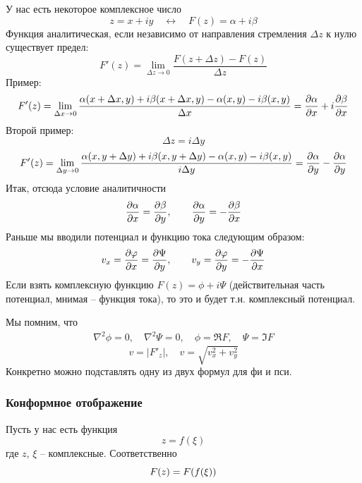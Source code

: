 У нас есть некоторое комплексное число
\begin{equation}
	z=x+iy 
	\quad \leftrightarrow \quad
	F(z)=\alpha+i \beta
\end{equation}
Функция аналитическая, если независимо от направления стремления $\Delta z$ к нулю существует предел:
\begin{equation}
	F'(z)=\lim\limits_{\Delta z\to0}\frac{F(z+\Delta z)-F(z)}{\Delta z}
\end{equation}
Пример:
\begin{equation}
	F'(z)=\lim\limits_{\Delta x\to0}\frac{\alpha(x+\Delta x,y)+i\beta(x+\Delta x,y)-\alpha(x,y)-i\beta(x,y)}{\Delta x}=
		\pdv{\alpha}{x}+i\pdv{\beta}{x}
\end{equation}
Второй пример:
\begin{equation}
	\Delta z=i\Delta y
\end{equation}
\begin{equation}
	F'(z)=\lim\limits_{\Delta y\to0}\frac{\alpha(x,y+\Delta y)+i\beta(x,y+\Delta y)-\alpha(x,y)-i\beta(x,y)}{i\Delta y}=
		\pdv{\alpha}{y}-\pdv{\alpha}{y}
\end{equation}
Итак, отсюда условие аналитичности
\begin{gather}
	\label{eq2}
	\pdv{\alpha}{x}=\pdv{\beta}{y}, \qquad
	\pdv{\alpha}{y}=-\pdv{\beta}{x}
\end{gather}
Раньше мы вводили потенциал и функцию тока следующим образом:
\begin{gather}
	\label{eq3}
	v_x=\pdv{\varphi}{x}=\pdv{\Psi}{y}, \qquad
	v_y=\pdv{\varphi}{y}=-\pdv{\Psi}{x}
\end{gather}
Если взять комплексную функцию $F(z)=\phi+i\Psi$ (действительная часть потенциал, мнимая --  функция тока), то это и будет т.н. комплексный потенциал.

Мы помним, что
\begin{gather}
	\nabla^2\phi=0,\quad
	\nabla^2\Psi=0,\quad
	\phi=\Re{F},\quad
	\Psi=\Im{F}
\end{gather}
\begin{equation}
	v=|F'_z|, \quad
	v=\sqrt{v_x^2+v_y^2}
\end{equation}
Конкретно можно подставлять одну из двух формул для фи и пси.

\subsubsection{Конформное отображение}
Пусть у нас есть функция
\begin{equation}
	z=f(\xi)
\end{equation}
где $z$, $\xi$ -- комплексные. Соответственно
\begin{equation}
	F(z)=F\qty(f(\xi))
\end{equation}

